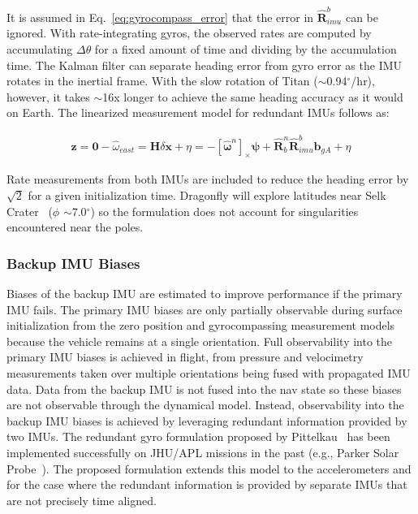 \noindent It is assumed in Eq.~\ref{eq:gyrocompass_error} that the error in $\hat{\bm{R}}_{imu}^{b}$ can be ignored. With rate-integrating gyros, the observed rates are computed by accumulating $\Delta\theta$ for a fixed amount of time and dividing by the accumulation time. The Kalman filter can separate heading error from gyro error as the IMU rotates in the inertial frame. With the slow rotation of Titan ($\sim$0.94$^\circ$/hr), however, it takes $\sim$16x longer to achieve the same heading accuracy as it would on Earth. The linearized measurement model for redundant IMUs follows as:

\begin{equation}
\begin{aligned}
\bm{z} = \bm{0} - \hat{\omega}_{east} = \bm{H}\delta \bm{x} + \eta = -\left[\hat{\bm{\omega}}^{n}\right]_{\times}\bm{\psi} + \hat{\bm{R}}_{b}^{n}\hat{\bm{R}}_{imu}^{b}\bm{b}_{gA} + \eta
\end{aligned}
\end{equation}

\noindent Rate measurements from both IMUs are included to reduce the heading error by $\sqrt{2}$ for a given initialization time. Dragonfly will explore latitudes near Selk Crater~\cite{barnes2021science} ($\phi$ $\sim$7.0$^\circ$) so the formulation does not account for singularities encountered near the poles.

\subsubsection{Backup IMU Biases}

Biases of the backup \ac{IMU} are estimated to improve performance if the primary \ac{IMU} fails. The primary IMU biases are only partially observable during surface initialization from the zero position and gyrocompassing measurement models because the vehicle remains at a single orientation. Full observability into the primary IMU biases is achieved in flight, from pressure and velocimetry measurements taken over multiple orientations being fused with propagated \ac{IMU} data. Data from the backup IMU is not fused into the nav state so these biases are not observable through the dynamical model. Instead, observability into the backup IMU biases is achieved by leveraging redundant information provided by two IMUs. The redundant gyro formulation proposed by Pittelkau~\cite{pittelkau} has been implemented successfully on JHU/APL missions in the past (e.g., Parker Solar Probe~\cite{kinnison2020parker}). The proposed formulation extends this model to the accelerometers and for the case where the redundant information is provided by separate IMUs that are not precisely time aligned. 

